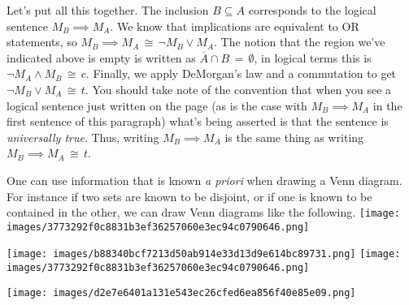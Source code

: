 \documentclass[10pt,]{book}
\theoremstyle{plain}
\theoremstyle{definition}
\theoremstyle{definition}
\numberwithin{equation}{section}
\begin{document}
    Let's put all this together. The inclusion \(B \subseteq A\) corresponds
    to the logical sentence \(M_B \implies M_A\). We know that implications
    are equivalent to OR statements, so \(M_B \implies M_A \, \cong \, 
    {\lnot}M_B \lor M_A\). The notion that the region we've
    indicated above is empty is written as \(\overline{A} \cap B \, = \, \emptyset\),
    in logical terms this is \({\lnot}M_A \land M_B \, \cong \, c\).
    Finally, we apply DeMorgan's law and a commutation to get
    \({\lnot}M_B \lor M_A \, \cong \, t\). You should take note of the
    convention that when you see a logical sentence just written on the
    page (as is the case with \(M_B \implies M_A\) in the first sentence
    of this paragraph) what's being asserted is that the sentence is
    \emph{universally true}.
    Thus, writing \(M_B \implies M_A\) is the same thing as writing
    \(M_B \implies M_A \, \cong \, t\).
\par

    One can use information that is known \emph{a priori} when
    drawing a Venn diagram. For instance if two sets are known
    to be disjoint, or if one is known to be contained in the other,
    we can draw Venn diagrams like the following.
\texttt{[image: images/3773292f0c8831b3ef36257060e3ec94c0790646.png]}
\par

    \ifx\SetFigFont\undefined\gdef\SetFigFont#1#2#3#4#5{
    \reset@font\fontsize{#1}{#2pt}
    \fontfamily{#3}\fontseries{#4}\fontshape{#5}
    \selectfont}\fi
\texttt{[image: images/b88340bcf7213d50ab914e33d13d9e614bc89731.png]}
\texttt{[image: images/3773292f0c8831b3ef36257060e3ec94c0790646.png]}
\par

    \ifx\SetFigFont\undefined\gdef\SetFigFont#1#2#3#4#5{
    \reset@font\fontsize{#1}{#2pt}
    \fontfamily{#3}\fontseries{#4}\fontshape{#5}
    \selectfont}\fi
\texttt{[image: images/d2e7e6401a131e543ec26cfed6ea856f40e85e09.png]}
\par
\end{document}

